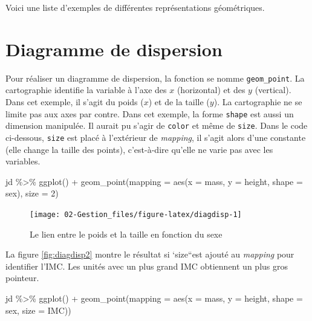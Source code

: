 \documentclass[
]{book}
\newenvironment{Shaded}{}{}
\newcommand{\AttributeTok}[1]{#1}
\newcommand{\DecValTok}[1]{#1}
\newcommand{\FunctionTok}[1]{#1}
\newcommand{\NormalTok}[1]{#1}
\newcommand{\SpecialCharTok}[1]{#1}
\begin{document}
Voici une liste d'exemples de différentes représentations géométriques.

\hypertarget{diagramme-de-dispersion}{%
\section{Diagramme de dispersion}\label{diagramme-de-dispersion}}

Pour réaliser un diagramme de dispersion, la fonction se nomme \texttt{geom\_point}. La cartographie identifie la variable à l'axe des \(x\) (horizontal) et des \(y\) (vertical). Dans cet exemple, il s'agit du poids (\(x\)) et de la taille (\(y\)). La cartographie ne se limite pas aux axes par contre. Dans cet exemple, la forme \texttt{shape} est aussi un dimension manipulée. Il aurait pu s'agir de \texttt{color} et même de \texttt{size}. Dans le code ci-dessous, \texttt{size} est placé à l'extérieur de \emph{mapping}, il s'agit alors d'une constante (elle change la taille des points), c'est-à-dire qu'elle ne varie pas avec les variables.

\begin{Shaded}
\begin{Highlighting}[]
\NormalTok{jd }\SpecialCharTok{\%\textgreater{}\%} 
  \FunctionTok{ggplot}\NormalTok{() }\SpecialCharTok{+} 
  \FunctionTok{geom\_point}\NormalTok{(}\AttributeTok{mapping =} \FunctionTok{aes}\NormalTok{(}\AttributeTok{x =}\NormalTok{ mass, }\AttributeTok{y =}\NormalTok{ height, }\AttributeTok{shape =}\NormalTok{ sex), }\AttributeTok{size =} \DecValTok{2}\NormalTok{) }
\end{Highlighting}
\end{Shaded}

\begin{figure}

{\centering \texttt{[image: 02-Gestion\_files/figure-latex/diagdisp-1]} 

}

\caption{Le lien entre le poids et la taille en fonction du sexe}\label{fig:diagdisp}
\end{figure}

La figure \ref{fig:diagdisp2} montre le résultat si `size``est ajouté au \emph{mapping} pour identifier l'IMC. Les unités avec un plus grand IMC obtiennent un plus gros pointeur.

\begin{Shaded}
\begin{Highlighting}[]
\NormalTok{jd }\SpecialCharTok{\%\textgreater{}\%} 
  \FunctionTok{ggplot}\NormalTok{() }\SpecialCharTok{+} 
  \FunctionTok{geom\_point}\NormalTok{(}\AttributeTok{mapping =} \FunctionTok{aes}\NormalTok{(}\AttributeTok{x =}\NormalTok{ mass, }\AttributeTok{y =}\NormalTok{ height, }\AttributeTok{shape =}\NormalTok{ sex, }\AttributeTok{size =}\NormalTok{ IMC)) }
\end{Highlighting}
\end{Shaded}
\end{document}
